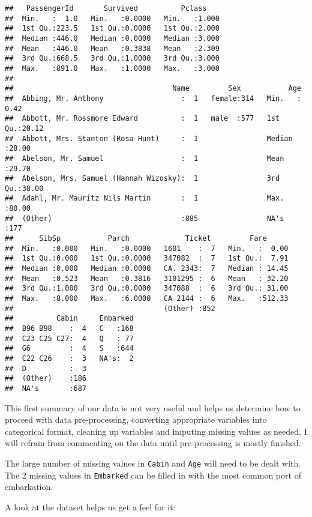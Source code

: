 \documentclass[]{article}
\begin{document}
\begin{verbatim}
##   PassengerId       Survived          Pclass     
##  Min.   :  1.0   Min.   :0.0000   Min.   :1.000  
##  1st Qu.:223.5   1st Qu.:0.0000   1st Qu.:2.000  
##  Median :446.0   Median :0.0000   Median :3.000  
##  Mean   :446.0   Mean   :0.3838   Mean   :2.309  
##  3rd Qu.:668.5   3rd Qu.:1.0000   3rd Qu.:3.000  
##  Max.   :891.0   Max.   :1.0000   Max.   :3.000  
##                                                  
##                                     Name         Sex           Age       
##  Abbing, Mr. Anthony                  :  1   female:314   Min.   : 0.42  
##  Abbott, Mr. Rossmore Edward          :  1   male  :577   1st Qu.:20.12  
##  Abbott, Mrs. Stanton (Rosa Hunt)     :  1                Median :28.00  
##  Abelson, Mr. Samuel                  :  1                Mean   :29.70  
##  Abelson, Mrs. Samuel (Hannah Wizosky):  1                3rd Qu.:38.00  
##  Adahl, Mr. Mauritz Nils Martin       :  1                Max.   :80.00  
##  (Other)                              :885                NA's   :177    
##      SibSp           Parch             Ticket         Fare       
##  Min.   :0.000   Min.   :0.0000   1601    :  7   Min.   :  0.00  
##  1st Qu.:0.000   1st Qu.:0.0000   347082  :  7   1st Qu.:  7.91  
##  Median :0.000   Median :0.0000   CA. 2343:  7   Median : 14.45  
##  Mean   :0.523   Mean   :0.3816   3101295 :  6   Mean   : 32.20  
##  3rd Qu.:1.000   3rd Qu.:0.0000   347088  :  6   3rd Qu.: 31.00  
##  Max.   :8.000   Max.   :6.0000   CA 2144 :  6   Max.   :512.33  
##                                   (Other) :852                   
##          Cabin     Embarked  
##  B96 B98    :  4   C   :168  
##  C23 C25 C27:  4   Q   : 77  
##  G6         :  4   S   :644  
##  C22 C26    :  3   NA's:  2  
##  D          :  3             
##  (Other)    :186             
##  NA's       :687
\end{verbatim}

This first summary of our data is not very useful and helps us determine
how to proceed with data pre-processing, converting appropriate
variables into categorical format, cleaning up variables and imputing
missing values as needed. I will refrain from commenting on the data
until pre-processing is mostly finished.

The large number of missing values in \texttt{Cabin} and \texttt{Age}
will need to be dealt with. The 2 missing values in \texttt{Embarked}
can be filled in with the most common port of embarkation.

A look at the dataset helps us get a feel for it:
\end{document}
